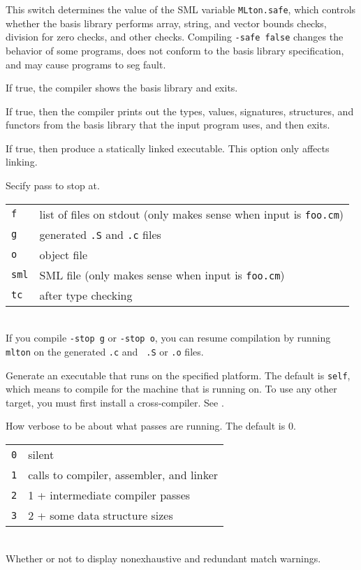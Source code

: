 \begin{description}
This switch determines the value of the SML variable {\tt MLton.safe},
which controls whether the basis library performs array, string, and
vector bounds checks, division for zero checks, and other checks.
Compiling {\tt -safe false} changes the behavior of some programs,
does not conform to the basis library specification, and may cause
programs to seg fault.

If true, the compiler shows the basis library and exits.

If true, then the compiler prints out the types, values, signatures,
structures, and functors from the basis library that the input program
uses, and then exits.

If true, then produce a statically linked executable.  This option
only affects linking.

Secify pass to stop at.\\
\begin{tabular}{ll}
{\tt f} & list of files on stdout (only makes sense when input is {\tt foo.cm})\\
{\tt g} & generated {\tt .S} and {\tt .c} files\\
{\tt o} & object file\\
{\tt sml} & SML file (only makes sense when input is {\tt foo.cm})\\
{\tt tc} & after type checking\\
\end{tabular}\\
If you compile {\tt -stop g} or {\tt -stop o}, you can resume
compilation by running {\tt mlton} on the generated {\tt .c} and {\tt
.S} or {\tt .o} files. 

Generate an executable that runs on the specified platform.  The default
is {\tt self}, which means to compile for the machine that {\mlton} is
running on.  To use any other target, you must first install a
cross-compiler.  See .

How verbose to be about what passes are running.  The default is 0.\\
\begin{tabular}{ll}
{\tt 0} & silent\\
{\tt 1} & calls to compiler, assembler, and linker\\
{\tt 2} & 1 + intermediate compiler passes\\
{\tt 3} & 2 + some data structure sizes\\
\end{tabular}\\

Whether or not to display nonexhaustive and redundant match warnings.

\end{description}

